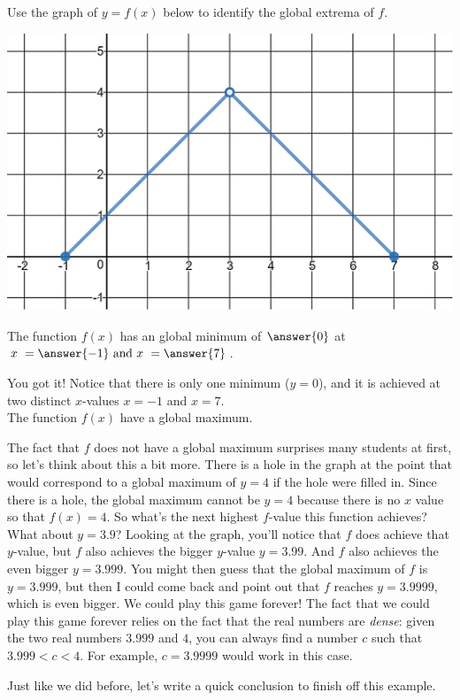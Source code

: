 \documentclass{ximera}
\begin{document}
\begin{exercise}
Use the graph of $y = f(x)$ below to identify the global extrema of $f$.

\begin{center} \includegraphics[scale=0.5]{extrema2new.png} \end{center}

The function $f(x)$ has an global minimum of $\answer{0}$ at $x \ = \answer{-1} \text{ and } x \ = \answer{7}$.  

\begin{exercise}
You got it!  Notice that there is only one minimum ($y=0$), and it is achieved at two distinct $x$-values $x=-1$ and $x=7$.  \\

The function $f(x)$  have a global maximum.  

\begin{explanation}
The fact that $f$ does not have a global maximum surprises many students at first, so let's think about this a bit more.  There is a hole in the graph at the point that would correspond to a global maximum of $y=4$ if the hole were filled in.  Since there is a hole, the global maximum cannot be $y=4$ because there is no $x$ value so that $f(x) = 4$.  So what's the next highest $f$-value this function achieves?  What about $y=3.9$?  Looking at the graph, you'll notice that $f$ does achieve that $y$-value, but $f$ also achieves the bigger $y$-value $y=3.99$.  And $f$ also achieves the even bigger $y=3.999$.  You might then guess that the global maximum of $f$ is $y=3.999$, but then I could come back and point out that $f$ reaches $y=3.9999$, which is even bigger.  We could play this game forever!  The fact that we could play this game forever relies on the fact that the real numbers are \textit{dense}: given the two real numbers $3.999$ and $4$, you can always find a number $c$ such that $3.999 < c < 4$.  For example, $c = 3.9999$ would work in this case.  
\end{explanation}
\begin{exercise}
Just like we did before, let's write a quick conclusion to finish off this example. \\


\end{exercise}
\end{exercise}
\end{exercise}
\end{document}
